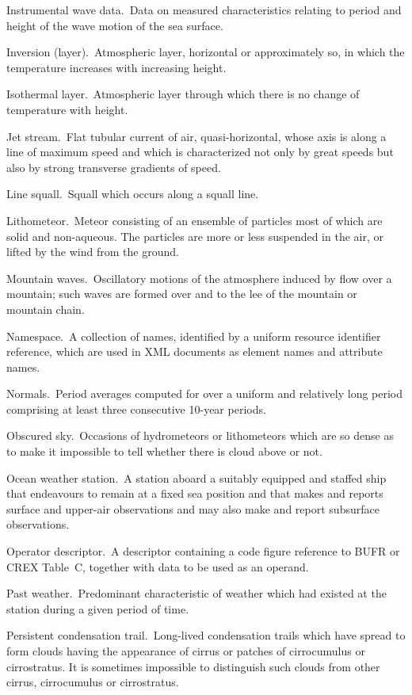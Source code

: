 Instrumental wave data. Data on measured characteristics relating to period and height of the wave motion of the sea surface.

Inversion (layer). Atmospheric layer, horizontal or approximately so, in which the temperature increases with increasing height.

Isothermal layer. Atmospheric layer through which there is no change of temperature with height.

Jet stream. Flat tubular current of air, quasi-horizontal, whose axis is along a line of maximum speed and which is characterized not only by great speeds but also by strong transverse gradients of speed.

Line squall. Squall which occurs along a squall line.

Lithometeor. Meteor consisting of an ensemble of particles most of which are solid and non-aqueous. The particles are more or less suspended in the air, or lifted by the wind from the ground.

Mountain waves. Oscillatory motions of the atmosphere induced by flow over a mountain; such waves are formed over and to the lee of the mountain or mountain chain.

Namespace. A collection of names, identified by a uniform resource identifier reference, which are used in XML documents as element names and attribute names.

Normals. Period averages computed for over a uniform and relatively long period comprising at least three consecutive 10-year periods.

Obscured sky. Occasions of hydrometeors or lithometeors which are so dense as to make it impossible to tell whether there is cloud above or not.

Ocean weather station. A station aboard a suitably equipped and staffed ship that endeavours to remain at a fixed sea position and that makes and reports surface and upper-air observations and may also make and report subsurface observations.

Operator descriptor. A descriptor containing a code figure reference to BUFR or CREX Table~C, together with data to be used as an operand.

Past weather. Predominant characteristic of weather which had existed at the station during a given period of time.

Persistent condensation trail. Long-lived condensation trails which have spread to form clouds having the appearance of cirrus or patches of cirrocumulus or cirrostratus. It is sometimes impossible to distinguish such clouds from other cirrus, cirrocumulus or cirrostratus.

